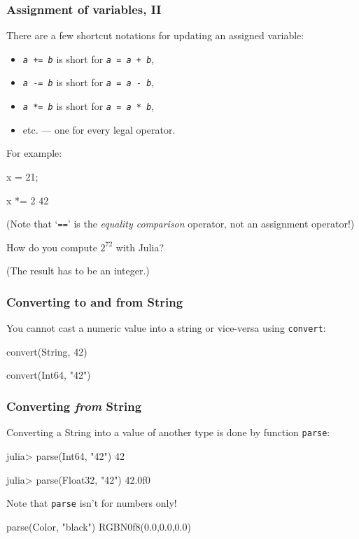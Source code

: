 \documentclass[english,serif,mathserif,xcolor=pdftex,dvipsnames,table]{beamer}
\begin{document}
\begin{frame}[fragile]
  \frametitle{Assignment of variables, II}
  There are a few shortcut notations for updating an assigned variable:
  \begin{itemize}
  \item[] \texttt{\emph{a} += \emph{b}} is short for \texttt{\emph{a} = \emph{a} + \emph{b}},
  \item[] \texttt{\emph{a} -= \emph{b}} is short for \texttt{\emph{a} = \emph{a} - \emph{b}},
  \item[] \texttt{\emph{a} *= \emph{b}} is short for \texttt{\emph{a} = \emph{a} * \emph{b}},
  \item[]   etc. --- one for every legal operator.
  \end{itemize}

  \+ For example:
\begin{semiverbatim}
\julia x = 21;

\julia x *= 2
42
\end{semiverbatim}

  \+
  (Note that `\texttt{==}' is the \emph{equality comparison} operator, not an assignment operator!)
\end{frame}


\begin{frame}
  \begin{exercise*}[1.B]
    How do you compute $2^{72}$ with Julia?

    (The result has to be an integer.)
  \end{exercise*}
\end{frame}


\begin{frame}[fragile]
  \frametitle{Converting to and from String}
  You cannot cast a numeric value into a string or vice-versa using \texttt{convert}:
\begin{semiverbatim}\smaller
\julia convert(String, 42)

\julia convert(Int64, "42")
\end{semiverbatim}
\end{frame}

\begin{frame}[fragile]
  \frametitle{Converting \emph{from} String}
  Converting a String into a value of another type is done by function \texttt{parse}:
\begin{semiverbatim}
julia> parse(Int64, "42")
42

julia> parse(Float32, "42")
42.0f0
\end{semiverbatim}

  \+
  Note that \texttt{parse} isn't for numbers only!
\begin{semiverbatim}
\julia parse(Color, "black")
RGB{N0f8}(0.0,0.0,0.0)
\end{semiverbatim}
\end{frame}
\end{document}

